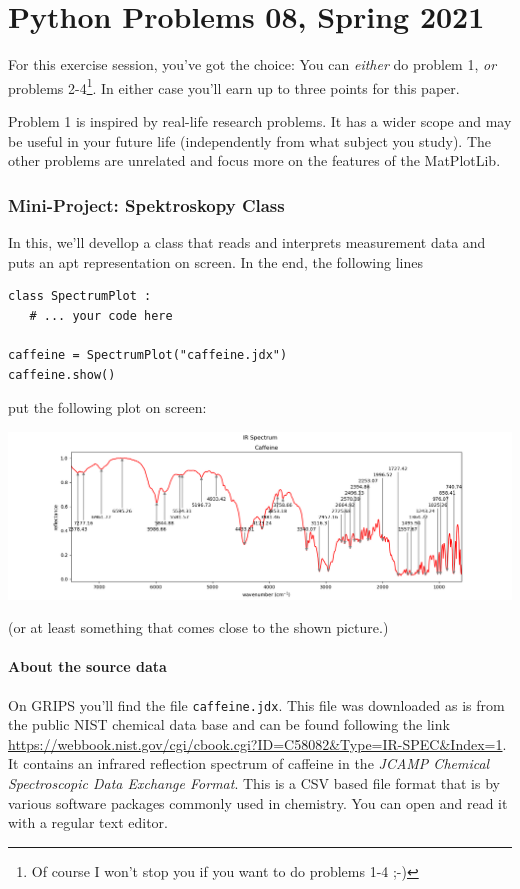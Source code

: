 \documentclass[
	english,
	fontsize=10pt,
	parskip=half,
	titlepage=true,
	DIV=12
]{scrartcl}
\begin{document}
\part*{Python Problems 08, Spring 2021}
For this exercise session, you've got the choice: You can \emph{either} do problem 1, \emph{or} problems 2-4\footnote{Of course I won't stop you if you want to do problems 1-4 ;-)}. In either case you'll earn up to three points for this paper.

Problem 1 is inspired by real-life research problems. It has a wider scope and may be useful in your future life (independently from what subject you study). The other problems are unrelated and focus more on the features of the MatPlotLib.

\section{Mini-Project: Spektroskopy Class}
In this, we'll devellop a class that reads and interprets measurement data and puts an apt representation on screen. In the end, the following lines
\begin{verbatim}
class SpectrumPlot :
   # ... your code here

caffeine = SpectrumPlot("caffeine.jdx")
caffeine.show()
\end{verbatim}
put the following plot on screen:

\includegraphics[width=\linewidth]{./task1-endresult}
\label{fig:SpectrumCaffeine}

(or at least something that comes close to the shown picture.)

\subsection{About the source data}
On GRIPS you'll find the file \texttt{caffeine.jdx}. This file was downloaded as is from the public NIST chemical data base and can be found following the link \url{https://webbook.nist.gov/cgi/cbook.cgi?ID=C58082&Type=IR-SPEC&Index=1}. It contains an infrared reflection spectrum of caffeine in the \emph{JCAMP Chemical Spectroscopic Data Exchange Format}. This is a CSV based file format that is by various software packages commonly used in chemistry. You can open and read it with a regular text editor.
\end{document}
